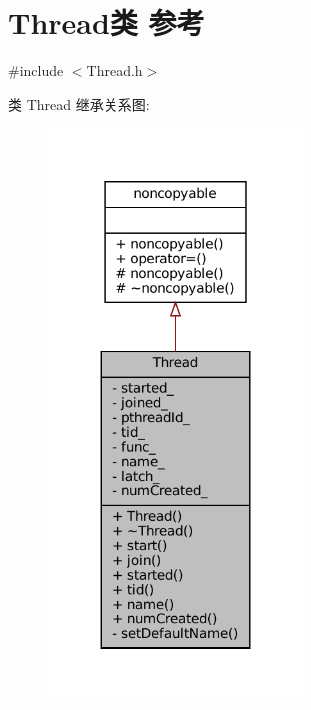 \hypertarget{classmuduo_1_1Thread}{}\section{Thread类 参考}
\label{classmuduo_1_1Thread}


{\ttfamily \#include $<$Thread.\+h$>$}



类 Thread 继承关系图\+:
\nopagebreak
\begin{figure}[H]
\begin{center}
\leavevmode
\includegraphics[width=191pt]{classmuduo_1_1Thread__inherit__graph}
\end{center}
\end{figure}


